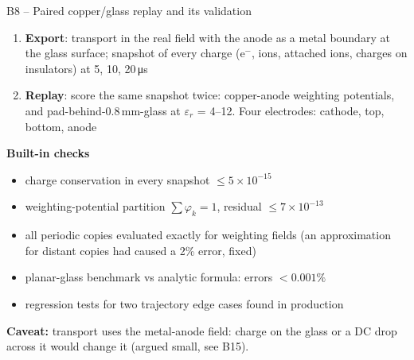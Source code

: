 \documentclass[aspectratio=169,11pt]{beamer}
\newcommand{\backlink}[1]{\hfill\hyperlink{#1}{\beamerreturnbutton{back}}}
\newcommand{\caveat}[1]{{\small\color{warn}\textbf{Caveat:} #1}}
\newcommand{\er}{\varepsilon_r}
\begin{document}
\begin{frame}[label=b-replay]{B8 -- Paired copper/glass replay and its validation}
  \small
  \begin{enumerate}
    \item \textbf{Export}: transport in the real field with the anode as a metal boundary at the glass surface; snapshot of every charge (e$^-$, ions, attached ions, charges on insulators) at 5, 10, 20\,\si{\micro s}
    \item \textbf{Replay}: score the same snapshot twice: copper-anode weighting potentials, and pad-behind-0.8\,mm-glass at $\er$ = 4--12. Four electrodes: cathode, top, bottom, anode
  \end{enumerate}
  \textbf{Built-in checks}
  \begin{itemize}
    \item charge conservation in every snapshot $\le 5\times10^{-15}$
    \item weighting-potential partition $\sum\varphi_k = 1$, residual $\le 7\times10^{-13}$
    \item all periodic copies evaluated exactly for weighting fields (an approximation for distant copies had caused a 2\% error, fixed)
    \item planar-glass benchmark vs analytic formula: errors $<0.001\%$
    \item regression tests for two trajectory edge cases found in production
  \end{itemize}
  \caveat{transport uses the metal-anode field: charge on the glass or a DC drop across it would change it (argued small, see B15).}
  \backlink{m-sim}
\end{frame}
\end{document}
